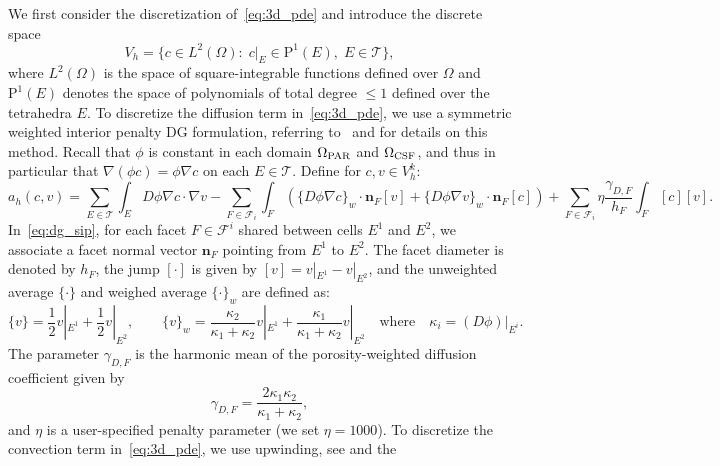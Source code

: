 \documentclass[fleqn,10pt]{wlscirep}
\begin{document}
We first consider the discretization of~\eqref{eq:3d_pde} and
introduce the discrete space
\begin{equation}
  V_h = \{c \in L^2(\Omega): \;  c \vert_E \in \mathrm{P}^1(E), \; E \in \mathcal{T}\} ,
\end{equation}
where $L^2(\Omega)$ is the space of square-integrable functions
defined over $\Omega$ and $\mathrm{P}^1(E)$ denotes the space of
polynomials of total degree $\leqslant 1$ defined over the tetrahedra
$E$. To discretize the diffusion term in~\eqref{eq:3d_pde}, we use a
symmetric weighted interior penalty DG formulation, referring
to~\cite{ern2009discontinuous} and \cite[Section
  4.5.2.3]{di2011mathematical} for details on this
method. Recall that $\phi$ is constant in each domain
  $\Omega_{\rm PAR}$ and $\Omega_{\rm CSF}$, and thus in particular
  that $\nabla (\phi c) = \phi \nabla c$ on each $E \in \mathcal{T}$.
Define for $c, v \in V_h^k$:
\begin{equation}
  a_h (c, v)
  =
  \sum_{E \in \mathcal{T}} \int_{E} D\phi \nabla c \cdot \nabla v
  - \sum_{F \in \mathcal{F}_i} \int_{F} \left( \{D \phi \nabla c \}_w \cdot \bm n_F [v]
  + \{D \phi \nabla v \}_w \cdot \bm n_F [c] \right) 
   + \sum_{F \in \mathcal{F}_i} \eta \frac{\gamma_{D,F}}{h_F} \int_{F} [c][v] 
  .
  \label{eq:dg_sip}
\end{equation}
In~\eqref{eq:dg_sip}, for each facet $F \in \mathcal{F}^i$ shared
between cells $E^1$ and $E^2$, we associate a  facet normal vector $\bm n_F$
pointing from $E^1$ to $E^2$. The facet diameter is denoted by $h_F$,
the jump $[\cdot]$ is given by $[v] = v|_{E^1} - v|_{E^2}$, and the
unweighted average $\{ \cdot \}$ and weighed average $\{ \cdot \}_w$
are defined as:
\begin{equation}
  \{v\} = \frac12 v |_{E^1} + \frac12 v |_{E^2}, \qquad
  \{v\}_{w} = \frac{\kappa_2}{\kappa_1 + \kappa_2} v |_{E^1} + \frac{\kappa_1}{\kappa_1 + \kappa_2} v |_{E^2}
  \quad \text{where} \quad \kappa_i = (D \phi) |_{E^i}.  
\end{equation}
The parameter $\gamma_{D,F}$ is the harmonic mean of the
porosity-weighted diffusion coefficient given by
\begin{equation}
  \gamma_{D,F} = \frac{2\kappa_1\kappa_2}{\kappa_1 + \kappa_2},
\end{equation}
and $\eta$ is a user-specified penalty parameter (we set $\eta=1000$). To discretize the convection term in~\eqref{eq:3d_pde}, we use
upwinding, see \cite[Section 2.3.1]{di2011mathematical} and the
\end{document}
